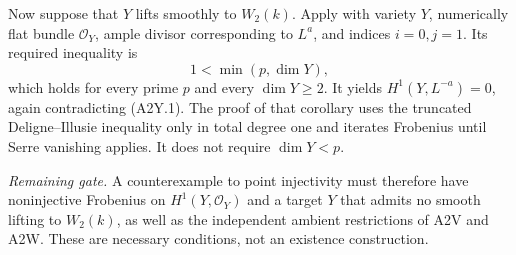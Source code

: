 Now suppose that $Y$ lifts smoothly to $W_2(k)$. Apply
\cite[Section 11 hypothesis and Corollary 11.2, p.~2116]{DGJ_Langer2011}
with variety $Y$, numerically flat bundle $\mathcal O_Y$,
ample divisor corresponding to $L^a$, and indices $i=0,j=1$.
Its required inequality is
\[
 1<\min(p,\dim Y),
\]
which holds for every prime $p$ and every $\dim Y\geq2$.
It yields $H^1(Y,L^{-a})=0$, again contradicting (A2Y.1).
The proof of that corollary uses the truncated
Deligne--Illusie inequality only in total degree one and
iterates Frobenius until Serre vanishing applies. It does
not require $\dim Y<p$.

\emph{Remaining gate.}
A counterexample to point injectivity must therefore have
noninjective Frobenius on $H^1(Y,\mathcal O_Y)$ and a target
$Y$ that admits no smooth lifting to $W_2(k)$, as well as
the independent ambient restrictions of A2V and A2W. These
are necessary conditions, not an existence construction.

